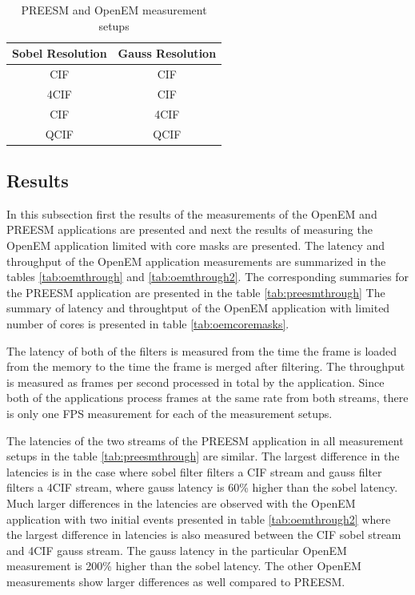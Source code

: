 \begin{table}
    \begin{center}
        \begin{tabular}{ c c }
            Sobel Resolution & Gauss Resolution \\ \hline
            CIF              & CIF              \\ \hline
            4CIF             & CIF              \\ \hline
            CIF              & 4CIF             \\ \hline
            QCIF             & QCIF             \\ \hline
        \end{tabular}
        \caption{PREESM and OpenEM measurement setups}
        \label{tab:preesm_setups}
    \end{center}
\end{table}

\subsection{Results}

In this subsection first the results of the measurements of the OpenEM and
PREESM applications are presented and next the results of measuring the OpenEM
application limited with core masks are presented. The latency and throughput of
the OpenEM application measurements are summarized in the tables
\ref{tab:oemthrough} and \ref{tab:oemthrough2}. The corresponding summaries for
the PREESM application are presented in the table \ref{tab:preesmthrough} The
summary of latency and throughtput of the OpenEM application with limited number
of cores is presented in table \ref{tab:oemcoremasks}.

The latency of both of the filters is measured from the time the frame is loaded
from the memory to the time the frame is merged after filtering. The throughput
is measured as frames per second processed in total by the application. Since
both of the applications process frames at the same rate from both streams,
there is only one FPS measurement for each of the measurement setups.

The latencies of the two streams of the PREESM application in all measurement
setups in the table \ref{tab:preesmthrough} are similar. The largest difference
in the latencies is in the case where sobel filter filters a CIF stream and
gauss filter filters a 4CIF stream, where gauss latency is 60\% higher than the
sobel latency. Much larger differences in the latencies are observed with the
OpenEM application with two initial events presented in table
\ref{tab:oemthrough2} where the largest difference in latencies is also measured
between the CIF sobel stream and 4CIF gauss stream. The gauss latency in the
particular OpenEM measurement is 200\% higher than the sobel latency. The other
OpenEM measurements show larger differences as well compared to PREESM.

